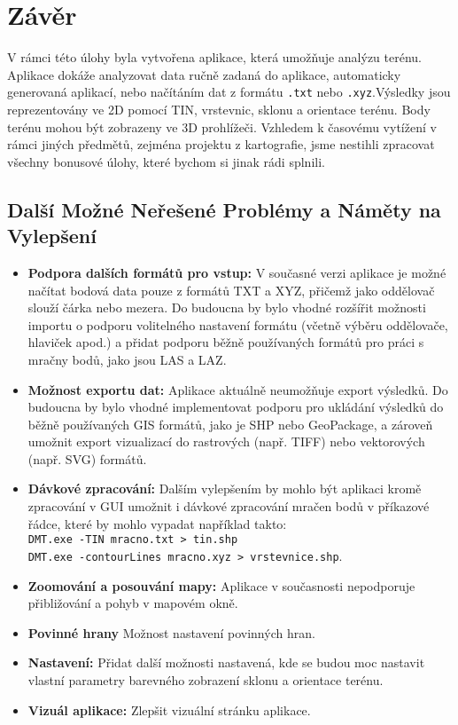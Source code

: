 \section{Závěr}
V rámci této úlohy byla vytvořena aplikace, která umožňuje analýzu terénu. Aplikace dokáže analyzovat data ručně zadaná do aplikace, automaticky generovaná aplikací, nebo načítáním dat z formátu \texttt{.txt} nebo \texttt{.xyz}.Výsledky jsou reprezentovány ve 2D pomocí TIN, vrstevnic, sklonu a orientace terénu. Body terénu mohou být zobrazeny ve 3D prohlížeči.
Vzhledem k časovému vytížení v rámci jiných předmětů, zejména projektu z kartografie, jsme nestihli zpracovat všechny bonusové úlohy, které bychom si jinak rádi splnili.

\subsection{Další Možné Neřešené Problémy a Náměty na Vylepšení}

\begin{itemize} 
    \item \textbf{Podpora dalších formátů pro vstup:} V současné verzi aplikace je možné načítat bodová data pouze z formátů TXT a XYZ, přičemž jako oddělovač slouží čárka nebo mezera. Do budoucna by bylo vhodné rozšířit možnosti importu o podporu volitelného nastavení formátu (včetně výběru oddělovače, hlaviček apod.) a přidat podporu běžně používaných formátů pro práci s mračny bodů, jako jsou LAS a LAZ.
    
    \item \textbf{Možnost exportu dat:} Aplikace aktuálně neumožňuje export výsledků. Do budoucna by bylo vhodné implementovat podporu pro ukládání výsledků do běžně používaných GIS formátů, jako je SHP nebo GeoPackage, a zároveň umožnit export vizualizací do rastrových (např. TIFF) nebo vektorových (např. SVG) formátů.
    
    \item \textbf{Dávkové zpracování:} Dalším vylepšením by mohlo být aplikaci kromě zpracování v GUI umožnit i dávkové zpracování mračen bodů v příkazové řádce, které by mohlo vypadat například takto:\\ \texttt{DMT.exe -TIN mracno.txt > tin.shp}\\ \texttt{DMT.exe -contourLines mracno.xyz > vrstevnice.shp}.
    
    \item \textbf{Zoomování a posouvání mapy:} Aplikace v současnosti nepodporuje přibližování a pohyb v mapovém okně.

    \item \textbf{Povinné hrany} Možnost nastavení povinných hran.

    \item \textbf{Nastavení:} Přidat další možnosti nastavená, kde se budou moc nastavit vlastní parametry barevného zobrazení sklonu a orientace terénu.

    \item \textbf{Vizuál aplikace:} Zlepšit vizuální stránku aplikace.

\end{itemize}
